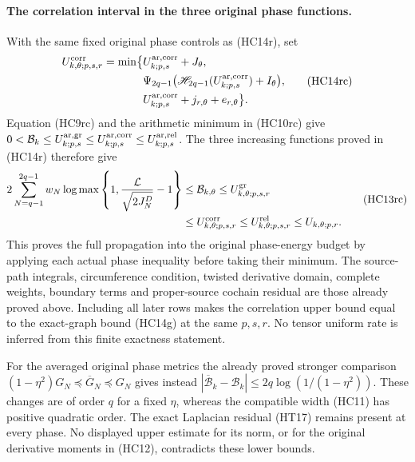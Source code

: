 \paragraph{The correlation interval in the three original phase functions.}
With the same fixed original phase controls as (HC14r), set
\[
\begin{aligned}
 U_{k,\theta;p,s,r}^{\rm corr}
 =\min\bigl\{&U_{k;p,s}^{\rm ar,corr}+J_\theta,\\
 &\Psi_{2q-1}\bigl(\mathscr H_{2q-1}
          (U_{k;p,s}^{\rm ar,corr})+I_\theta\bigr),\\
 &U_{k;p,s}^{\rm ar,corr}+j_{r,\theta}+e_{r,\theta}\bigr\}.
\end{aligned}\tag{HC14rc}
\]
Equation (HC9rc) and the arithmetic minimum in (HC10rc) give
$0<\mathcal B_k\leq U_{k;p,s}^{\rm ar,gr}
\leq U_{k;p,s}^{\rm ar,corr}\leq U_{k;p,s}^{\rm ar,rel}$.
The three increasing functions proved in (HC14r) therefore give
\[
\begin{aligned}
 2\sum_{N=q-1}^{2q-1}w_N
 \log\max\left\{1,\frac{\mathcal L}{\sqrt{2J_N^D}}-1\right\}
 &\leq\mathcal B_{k,\theta}\leq U_{k,\theta;p,s,r}^{\rm gr}\\
 &\leq U_{k,\theta;p,s,r}^{\rm corr}
 \leq U_{k,\theta;p,s,r}^{\rm rel}\leq U_{k,\theta;p,r}.
\end{aligned}\tag{HC13rc}
\]
This proves the full propagation into the original phase-energy
budget by applying each actual phase inequality before taking
their minimum. The source-path integrals, circumference condition,
twisted derivative domain, complete weights, boundary terms and
proper-source cochain residual are those already proved above.
Including all later rows makes the correlation upper bound equal
to the exact-graph bound (HC14g) at the same $p,s,r$. No tensor
uniform rate is inferred from this finite exactness statement.


For the averaged original phase metrics the already proved stronger
comparison $(1-\eta^2)G_N\preceq\overline G_N\preceq G_N$ gives instead
$|\overline{\mathcal B}_k-\mathcal B_k|
\leq2q\log(1/(1-\eta^2))$.  These changes are of order $q$ for a fixed
$\eta$, whereas the compatible width (HC11) has positive quadratic
order.  The exact Laplacian residual (HT17) remains present at every
phase.  No displayed upper estimate for its norm, or for the original
derivative moments in (HC12), contradicts these lower bounds.

